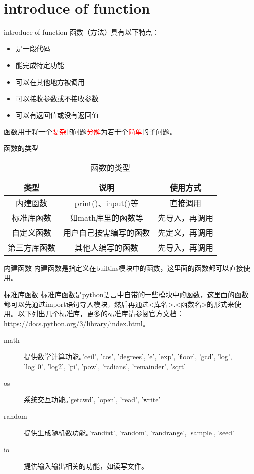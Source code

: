 \documentclass{beamer}
\begin{document}
\section{introduce of function}
\begin{frame}{introduce of function}
函数（方法）具有以下特点：
\begin{itemize}
\item 是一段代码
\item 能完成特定功能
\item 可以在其他地方被调用
\item 可以接收参数或不接收参数
\item 可以有返回值或没有返回值
\end{itemize}
函数用于将一个\textcolor{red}{复杂}的问题\textcolor{red}{分解}为若干个\textcolor{red}{简单}的子问题。
\end{frame}
\begin{frame}{函数的类型}
\begin{table}
\caption{函数的类型}
\begin{center}
\begin{tabular}{ccc}
\toprule
类型&说明&使用方式\\
\midrule
内建函数 &  print()、input()等&直接调用\\
标准库函数&如math库里的函数等&先导入，再调用\\
自定义函数&用户自己按需编写的函数&先定义，再调用\\
第三方库函数&其他人编写的函数&先导入，再调用\\
\bottomrule
\end{tabular}
\end{center}

\end{table}
\end{frame}
\begin{frame}{内建函数}
内建函数是指定义在builtins模块中的函数，这里面的函数都可以直接使用。
\end{frame}
\begin{frame}{标准库函数}
标准库函数是python语言中自带的一些模块中的函数，这里面的函数都可以先通过import语句导入模块，然后再通过<库名>.<函数名>的形式来使用。以下列出几个标准库，更多的标准库请参阅官方文档：\url{https://docs.python.org/3/library/index.html}。
\begin{description}
\item[ math ] 提供数学计算功能。'ceil', 'cos', 'degrees', 'e', 'exp', 'floor', 'gcd', 'log', 'log10', 'log2', 'pi', 'pow', 'radians', 'remainder', 'sqrt'
\item[ os ] 系统交互功能。'getcwd', 'open', 'read', 'write'
\item[ random ] 提供生成随机数功能。'randint', 'random', 'randrange', 'sample', 'seed'
\item[ io ] 提供输入输出相关的功能，如读写文件。
\end{description}

\end{frame}
\end{document}
